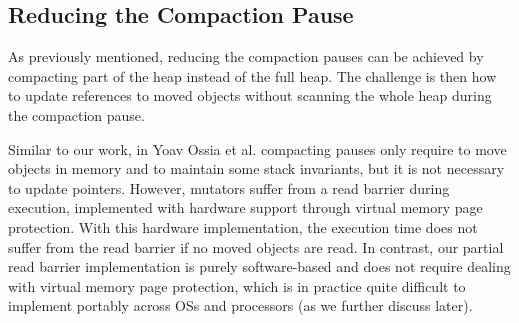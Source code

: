 \documentclass[sigplan,10pt,screen]{acmart}\settopmatter{printfolios=true,printccs=true,printacmref=true}
\begin{document}
\subsection{Reducing the Compaction Pause}

As previously mentioned, reducing the compaction pauses can be achieved by compacting part of the heap instead of the full heap. The challenge is then how to update references to moved objects without scanning the whole heap during the compaction pause.

Similar to our work, in Yoav Ossia et al. \cite{VirtualMemConcCompact} compacting pauses only require to move objects in memory and to maintain some stack invariants, but it is not necessary to update pointers. 
However, mutators suffer from a read barrier during execution, implemented with hardware support through virtual memory page protection. With this hardware implementation, the execution time does not suffer from the read barrier if no moved objects are read. 
In contrast, our partial read barrier implementation is purely software-based and does not require dealing with virtual memory page protection, which is in practice quite difficult to implement portably across OSs and processors (as we further discuss later). %
\end{document}
